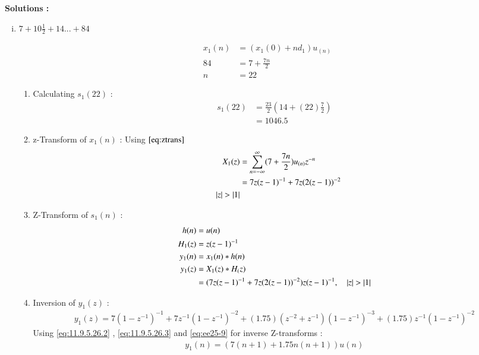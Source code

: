 \documentclass[journal,12pt,onecolumn]{IEEEtran}
\theoremstyle{remark}
\begin{document}
\textbf{Solutions :}

\begin{enumerate}[(i)]
\item
$ 7 + 10\frac{1}{2} + 14 ... + 84$
\vspace{0.5cm}

\begin{align}
x_1(n) &= (x_1(0) + nd_1)u_{(n)}\\
84 &= 7+\frac{7n}{2}\\
n &= 22
\end{align}

\begin{enumerate}[1.]
\item 
Calculating $s_1(22)$ : 
\begin{align}
    s_1{(22)} &= \frac{23}{2}(14+(22)\frac{7}{2})\\
     &= 1046.5
    \end{align}
    
\item 
z-Transform of $x_1(n)$ :
Using $\eqref{eq:ztrans}$
\begin{align}
X_1(z) &= \sum_{n=-\infty}^{\infty}(7 + \frac{7n}{2})u_{(n)}z^{-n} \\
&= 7z(z-1)^{-1} + 7z(2(z-1))^{-2}  \label{eq:ee25-4}\\
\quad \left\vert z\right\vert>\left\vert1\right\vert 
\end{align}
\item
Z-Transform of $s_1(n)$ :
\begin{align}
         h(n) &= u(n) \\
                 H_1(z) &= z(z-1)^{-1} \label{eq:ee25-9}\\
    y_1(n) &= x_1(n) * h(n) \\
    y_1(z) &= X_1(z) * H_(z)\\
 &= (7z(z-1)^{-1}+
7z(2(z-1))^{-2})z(z-1)^{-1}
,\quad \left\vert z\right\vert>\left\vert1\right\vert     
\end{align}
        \item
Inversion of $y_1(z)$ :
\begin{align}
    y_1(z) = 7(1-z^{-1})^{-1} + 7z^{-1}(1-z^{-1})^{-2} + (1.75)(z^{-2} + z^{-1})(1-z^{-1})^{-3} + (1.75)z^{-1}(1-z^{-1})^{-2}  
\end{align}
Using \eqref{eq:11.9.5.26.2} , \eqref{eq:11.9.5.26.3} and \eqref{eq:ee25-9} for inverse Z-transforms :
\begin{align}
 y_1(n) = (7(n+1) + 1.75n(n+1))u(n)
\end{align}
\end{enumerate}    


\end{enumerate}
\end{document}
